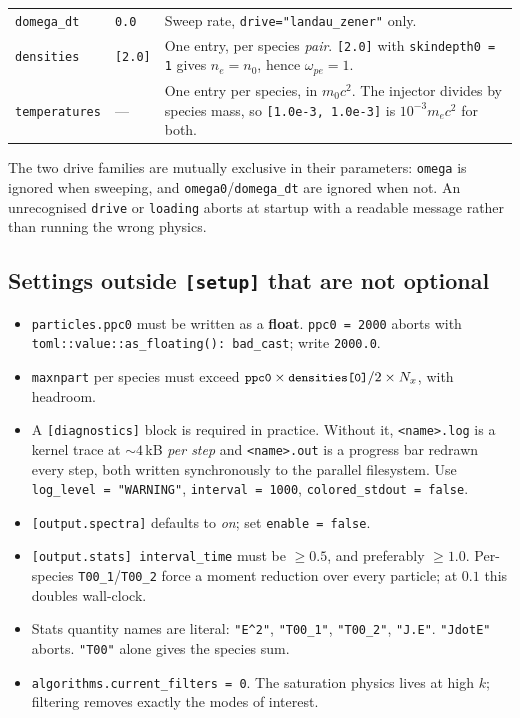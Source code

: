 \documentclass[11pt,a4paper]{article}
\newcommand{\code}[1]{\texttt{\small #1}}
\begin{document}
\begin{center}
\begin{tabular}{@{}llp{7.4cm}@{}}
\code{domega\_dt}   & \code{0.0}         & Sweep rate, \code{drive="landau\_zener"} only. \\
\code{densities}    & \code{[2.0]}       & One entry, per species \emph{pair}.
                                           \code{[2.0]} with \code{skindepth0 = 1}
                                           gives $n_e = n_0$, hence $\omega_{pe}=1$. \\
\code{temperatures} & ---                & One entry per species, in $m_0c^2$. The
                                           injector divides by species mass, so
                                           \code{[1.0e-3, 1.0e-3]} is
                                           $10^{-3}m_ec^2$ for both. \\
\bottomrule
\end{tabular}
\end{center}

\noindent The two drive families are mutually exclusive in their parameters:
\code{omega} is ignored when sweeping, and \code{omega0}/\code{domega\_dt} are ignored
when not. An unrecognised \code{drive} or \code{loading} aborts at startup with a
readable message rather than running the wrong physics.

\subsection{Settings outside \code{[setup]} that are not optional}
\label{sec:deckmust}

\begin{itemize}[nosep]
  \item \code{particles.ppc0} must be written as a \textbf{float}.
        \code{ppc0 = 2000} aborts with
        \code{toml::value::as\_floating(): bad\_cast}; write \code{2000.0}.
  \item \code{maxnpart} per species must exceed
        $\code{ppc0}\times\code{densities[0]}/2\times N_x$, with headroom.
  \item A \code{[diagnostics]} block is required in practice.
        Without it, \code{<name>.log} is a kernel trace at ${\sim}4$\,kB
        \emph{per step} and \code{<name>.out} is a progress bar redrawn every step,
        both written synchronously to the parallel filesystem. Use
        \code{log\_level = "WARNING"}, \code{interval = 1000},
        \code{colored\_stdout = false}.
  \item \code{[output.spectra]} defaults to \emph{on}; set \code{enable = false}.
  \item \code{[output.stats] interval\_time} must be $\ge 0.5$, and preferably
        $\ge 1.0$. Per-species \code{T00\_1}/\code{T00\_2} force a moment reduction
        over every particle; at $0.1$ this doubles wall-clock.
  \item Stats quantity names are literal: \code{"E\^{}2"}, \code{"T00\_1"},
        \code{"T00\_2"}, \code{"J.E"}. \code{"JdotE"} aborts. \code{"T00"} alone gives
        the species sum.
  \item \code{algorithms.current\_filters = 0}. The saturation physics lives at high
        $k$; filtering removes exactly the modes of interest.
\end{itemize}
\end{document}
